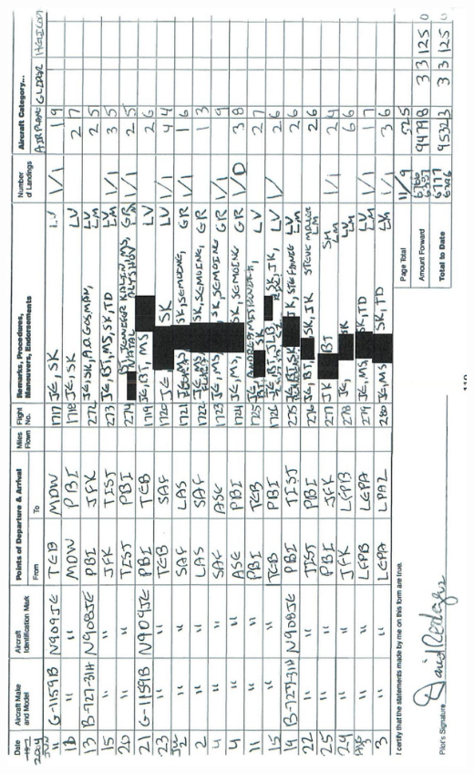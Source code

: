 \documentclass[10pt]{article}
\begin{document}
\includegraphics[max width=\textwidth, center]{2025_02_27_dd68c3d38de88f0516d9g-114}\\
\end{document}
